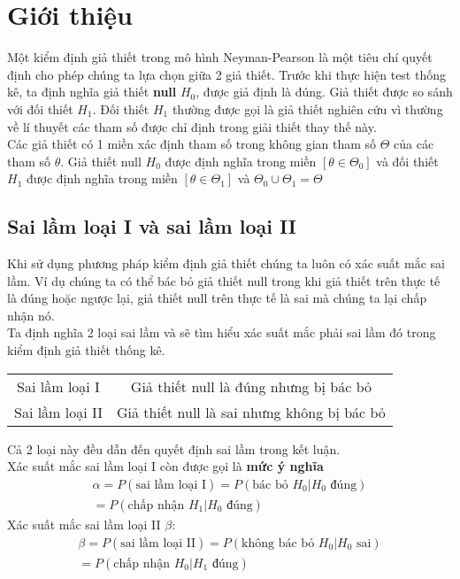 \chapter{Giới thiệu}
Một kiểm định giả thiết trong mô hình Neyman-Pearson là một tiêu chí quyết định 
cho phép chúng ta lựa chọn giữa 2 giả thiết. Trước khi thực hiện test thống kê, 
ta định nghĩa giả thiết \textbf{null} $H_0$, được giả định là đúng. Giả thiết được
so sánh với đối thiết $H_1$. Đối thiết $H_1$ thường được gọi là giả thiết nghiên cứu
vì thường về lí thuyết các tham số được chỉ định trong giải thiết thay thế này. \\

Các giả thiết có 1 miền xác định tham số  trong không gian tham số $\Theta$ của 
các tham số $\theta$. Giả thiết null $H_0$ được định nghĩa trong miền 
$[\theta \in \Theta_0]$ và đối thiết $H_1$ được định nghĩa trong miền
$[\theta \in \Theta_1]$ và $\Theta_0 \cup \Theta_1 = \Theta$

\section{Sai lầm loại I và sai lầm loại II}
Khi sử dụng phương pháp kiểm định giả thiết chúng ta luôn có xác suất mắc sai lầm.
Ví dụ chúng ta có thể bác bỏ giả thiết null trong khi giả thiết trên thực tế là đúng
hoặc ngược lại, giả thiết null trên thực tế là sai mà chúng ta lại chấp nhận nó. \\ 
Ta định nghĩa 2 loại sai lầm và sẽ tìm hiểu xác suất mắc phải sai lầm đó trong kiểm định 
giả thiết thống kê.

\begin{center}
    \begin{tabular}{| c | c |}
        \hline
        Sai lầm loại I & Giả thiết null là đúng nhưng bị bác bỏ \\
		Sai lầm loại II & Giả thiết null là sai nhưng không bị bác bỏ \\
        \hline
    \end{tabular}
\end{center}

Cả 2 loại này đều dẫn đến quyết định sai lầm trong kết luận.\\
Xác suất mắc sai lầm loại I còn được gọi là \textbf{mức ý nghĩa}
\begin{equation}
	\begin{split}
		\alpha = P(\text{sai lầm loại I}) = P(\text{bác bỏ } H_0 | H_0 \text{ đúng}) \\
		= P(\text{chấp nhận } H_1 | H_0 \text{ đúng})	
	\end{split}
\end{equation}
Xác suất mắc sai lầm loại II $\beta$:
\begin{equation}
	\begin{split}
		\beta = P(\text{sai lầm loại II}) = P(\text{không bác bỏ } H_0 | H_0 \text{ sai}) \\
	= P(\text{chấp nhận } H_0 | H_1 \text{ đúng})
	\end{split}
\end{equation}

